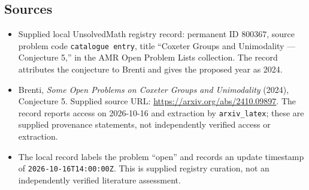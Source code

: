 \documentclass[11pt]{article}
\begin{document}
\subsection{Sources}
\begin{itemize}
\item Supplied local UnsolvedMath registry record: permanent ID \(800367\), source problem code \texttt{catalogue entry}, title ``Coxeter Groups and Unimodality --- Conjecture 5,'' in the AMR Open Problem Lists collection. The record attributes the conjecture to Brenti and gives the proposed year as 2024.
\item Brenti, \emph{Some Open Problems on Coxeter Groups and Unimodality} (2024), Conjecture 5. Supplied source URL: \url{https://arxiv.org/abs/2410.09897}. The record reports access on 2026-10-16 and extraction by \texttt{arxiv\_latex}; these are supplied provenance statements, not independently verified access or extraction.
\item The local record labels the problem ``open'' and records an update timestamp of \texttt{2026-10-16T14:00:00Z}. This is supplied registry curation, not an independently verified literature assessment.
\end{itemize}
\end{document}
